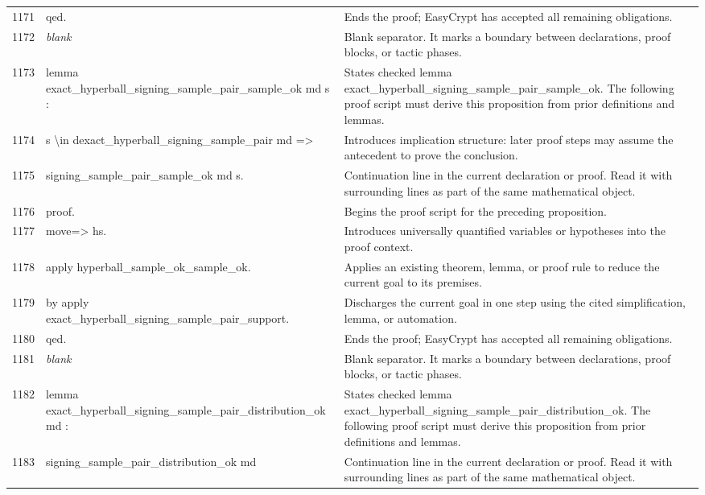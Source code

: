 \documentclass[10pt]{article}
\begin{document}
\begin{longtable}{r L{0.53\textwidth} L{0.37\textwidth}}
1171 & {\ttfamily\scriptsize qed.} & Ends the proof; EasyCrypt has accepted all remaining obligations. \\
1172 & {\ttfamily\scriptsize \emph{blank}} & Blank separator.  It marks a boundary between declarations, proof blocks, or tactic phases. \\
1173 & {\ttfamily\scriptsize lemma exact\_hyperball\_signing\_sample\_pair\_sample\_ok md s :} & States checked lemma exact\_hyperball\_signing\_sample\_pair\_sample\_ok.  The following proof script must derive this proposition from prior definitions and lemmas. \\
1174 & {\ttfamily\scriptsize   s \textbackslash{}in dexact\_hyperball\_signing\_sample\_pair md =>} & Introduces implication structure: later proof steps may assume the antecedent to prove the conclusion. \\
1175 & {\ttfamily\scriptsize   signing\_sample\_pair\_sample\_ok md s.} & Continuation line in the current declaration or proof.  Read it with surrounding lines as part of the same mathematical object. \\
1176 & {\ttfamily\scriptsize proof.} & Begins the proof script for the preceding proposition. \\
1177 & {\ttfamily\scriptsize move=> hs.} & Introduces universally quantified variables or hypotheses into the proof context. \\
1178 & {\ttfamily\scriptsize apply hyperball\_sample\_ok\_sample\_ok.} & Applies an existing theorem, lemma, or proof rule to reduce the current goal to its premises. \\
1179 & {\ttfamily\scriptsize by apply exact\_hyperball\_signing\_sample\_pair\_support.} & Discharges the current goal in one step using the cited simplification, lemma, or automation. \\
1180 & {\ttfamily\scriptsize qed.} & Ends the proof; EasyCrypt has accepted all remaining obligations. \\
1181 & {\ttfamily\scriptsize \emph{blank}} & Blank separator.  It marks a boundary between declarations, proof blocks, or tactic phases. \\
1182 & {\ttfamily\scriptsize lemma exact\_hyperball\_signing\_sample\_pair\_distribution\_ok md :} & States checked lemma exact\_hyperball\_signing\_sample\_pair\_distribution\_ok.  The following proof script must derive this proposition from prior definitions and lemmas. \\
1183 & {\ttfamily\scriptsize   signing\_sample\_pair\_distribution\_ok md} & Continuation line in the current declaration or proof.  Read it with surrounding lines as part of the same mathematical object. \\

\end{longtable}
\end{document}
